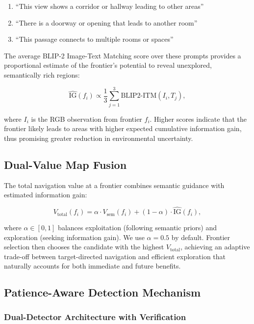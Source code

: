 \documentclass[conference]{IEEEtran}
\begin{document}
\begin{enumerate}[nosep]
    \item ``This view shows a corridor or hallway leading to other areas''
    \item ``There is a doorway or opening that leads to another room''
    \item ``This passage connects to multiple rooms or spaces''
\end{enumerate}

The average BLIP-2 Image-Text Matching score over these prompts provides a proportional estimate of the frontier's potential to reveal unexplored, semantically rich regions:

\[
\widehat{\text{IG}}(f_i) \propto \frac{1}{3} \sum_{j=1}^{3} \text{BLIP2-ITM}(I_i, T_j),
\]

where \(I_i\) is the RGB observation from frontier \(f_i\). Higher scores indicate that the frontier likely leads to areas with higher expected cumulative information gain, thus promising greater reduction in environmental uncertainty.

\subsection{Dual-Value Map Fusion}
\label{subsec:fusion}

The total navigation value at a frontier combines semantic guidance with estimated information gain:

\[
V_{\text{total}}(f_i) = \alpha \cdot V_{\text{sem}}(f_i) + (1 - \alpha) \cdot \widehat{\text{IG}}(f_i),
\]

where \(\alpha \in [0,1]\) balances exploitation (following semantic priors) and exploration (seeking information gain). We use \(\alpha = 0.5\) by default. Frontier selection then chooses the candidate with the highest \(V_{\text{total}}\), achieving an adaptive trade-off between target-directed navigation and efficient exploration that naturally accounts for both immediate and future benefits.

\subsection{Patience-Aware Detection Mechanism}
\label{subsec:detection}

\subsubsection{Dual-Detector Architecture with Verification}
\end{document}
